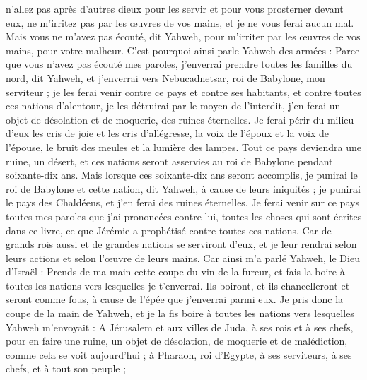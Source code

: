 \begin{multicols}{2}
n'allez pas après d'autres dieux pour les servir et pour vous prosterner devant eux, ne m'irritez pas par les œuvres de vos mains, et je ne vous ferai aucun mal.
Mais vous ne m'avez pas écouté, dit Yahweh, pour m'irriter par les œuvres de vos mains, pour votre malheur.
C'est pourquoi ainsi parle Yahweh des armées : Parce que vous n'avez pas écouté mes paroles,
j'enverrai prendre toutes les familles du nord, dit Yahweh, et j'enverrai vers Nebucadnetsar, roi de Babylone, mon serviteur ; je les ferai venir contre ce pays et contre ses habitants, et contre toutes ces nations d'alentour, je les détruirai par le moyen de l'interdit, j’en ferai un objet de désolation et de moquerie, des ruines éternelles.
Je ferai périr du milieu d’eux les cris de joie et les cris d'allégresse, la voix de l'époux et la voix de l'épouse, le bruit des meules et la lumière des lampes.
Tout ce pays deviendra une ruine, un désert, et ces nations seront asservies au roi de Babylone pendant soixante-dix ans.
Mais lorsque ces soixante-dix ans seront accomplis, je punirai le roi de Babylone et cette nation, dit Yahweh, à cause de leurs iniquités ; je punirai le pays des Chaldéens, et j’en ferai des ruines éternelles.
Je ferai venir sur ce pays toutes mes paroles que j'ai prononcées contre lui, toutes les choses qui sont écrites dans ce livre, ce que Jérémie a prophétisé contre toutes ces nations.
Car de grands rois aussi et de grandes nations se serviront d'eux, et je leur rendrai selon leurs actions et selon l'œuvre de leurs mains.
Car ainsi m’a parlé Yahweh, le Dieu d'Israël : Prends de ma main cette coupe du vin de la fureur, et fais-la boire à toutes les nations vers lesquelles je t'enverrai.
Ils boiront, et ils chancelleront et seront comme fous, à cause de l'épée que j'enverrai parmi eux.
Je pris donc la coupe de la main de Yahweh, et je la fis boire à toutes les nations vers lesquelles Yahweh m'envoyait :
A Jérusalem et aux villes de Juda, à ses rois et à ses chefs, pour en faire une ruine, un objet de désolation, de moquerie et de malédiction, comme cela se voit aujourd'hui ;
à Pharaon, roi d'Egypte, à ses serviteurs, à ses chefs, et à tout son peuple ;

\end{multicols}
